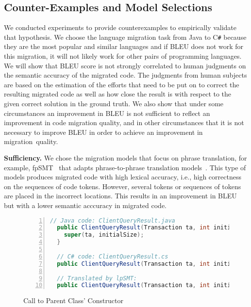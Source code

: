 \subsection{Counter-Examples and Model Selections}


We conducted experiments to provide counterexamples to empirically
validate that hypothesis. We choose the language migration task from
Java to C\texttt{\#} because they are the most popular and similar
languages and if BLEU does not work for this migration, it will not
likely work for other pairs of programming languages.
%
We will show that BLEU score is not strongly correlated to human
judgments on the semantic accuracy of the migrated code. The judgments
from human subjects are based on the estimation of the efforts that
need to be put on to correct the resulting migrated code as well as
how close the result is with respect to the given correct solution in
the ground truth.
%
We also show that under some circumstances an improvement in BLEU is
not sufficient to reflect an improvement in code migration quality,
and in other circumstances that it is not necessary to improve BLEU in
order to achieve an improvement in migration~quality.

{\bf Sufficiency.} We chose the migration models that focus on phrase
translation, for example, fpSMT~\cite{fse13-nier,karaivanov14} that
adapts phrase-to-phrase translation models~\cite{phrasal10}. This type
of models produces migrated code with high lexical accuracy, i.e.,
high correctness on the sequences of code tokens. However, several
tokens or sequences of tokens are placed in the incorrect locations.
This results in an improvement in BLEU but with a lower semantic
acccuracy in migrated code.


\begin{figure}[t]
\centering
\begin{lstlisting}[basicstyle=\small\sffamily, stepnumber=1, numbers=left, language=Java, aboveskip=1pt,  belowskip=1pt, numbersep=-5pt]
  // Java code: ClientQueryResult.java
  public ClientQueryResult(Transaction ta, int initialSize) {
    super(ta, initialSize);
  }

  // C# code: ClientQueryResult.cs
  public ClientQueryResult(Transaction ta, int initialSize) : base(ta, initialSize) {}

  // Translated by lpSMT:
  public ClientQueryResult(Transaction ta, int initialSize) : base(ta {, initialSize) ; }
\end{lstlisting}
\caption{Call to Parent Class' Constructor ~\cite{fse13-nier}}
\label{fig:issueexample2}
\end{figure}

